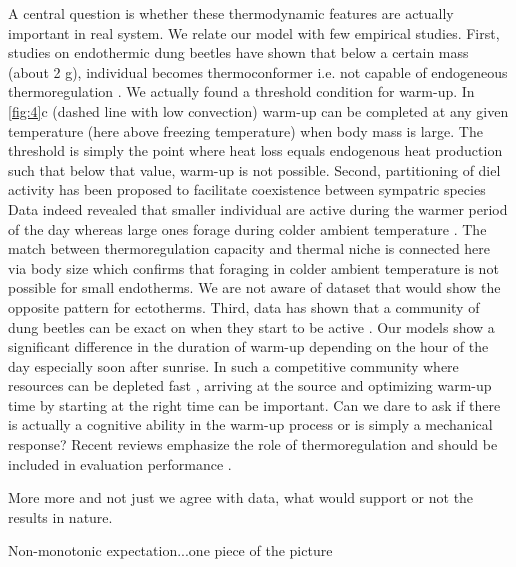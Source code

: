 A central question is whether these thermodynamic features are actually important in real system.  
We relate our model with few empirical studies.
First, studies on endothermic dung beetles have shown that below a certain mass (about 2 g), individual becomes thermoconformer i.e. not capable of endogeneous thermoregulation \citep{Bartholomew1978, Verdu2006}.
We actually found a threshold condition for warm-up.
In \cref{fig:4}c (dashed line with low convection) warm-up can be completed at any given temperature (here above freezing temperature) when body mass is large.
The threshold is simply the point where heat loss equals endogenous heat production such that  below that value, warm-up is not possible.
Second, partitioning of diel activity has been proposed to facilitate coexistence between sympatric species \citep{Viljanen2009}
Data indeed revealed that smaller  individual are active during the warmer period of the day whereas large ones forage during colder ambient temperature \citep{May1985}.
The match between thermoregulation capacity and thermal niche is connected here via body size which confirms that foraging in colder ambient temperature is not possible for small endotherms.
We are not aware of dataset that would show the opposite pattern for ectotherms. %
Third, data has shown that a community of dung beetles can be exact on when they start to be active \citep[e.g.,][]{Halffter1966, Caveney1995}.
Our models show a significant difference in the duration of warm-up depending on the hour of the day especially soon after sunrise.
In such a competitive community where resources can be depleted fast \citep{Hanski1991}, arriving at the source and optimizing warm-up time by starting at the right time can be important.
Can we dare to ask if there is actually a cognitive ability in the warm-up process or is simply a mechanical response?  %
Recent reviews emphasize the role of thermoregulation and should be included in evaluation performance \citep{Dial2008, Kalinkat2015}.

More more and not just we agree with data, what would support or not the results in nature.

Non-monotonic expectation...one piece of the picture

